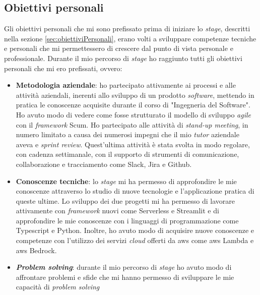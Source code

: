 \subsection{Obiettivi personali}
Gli obiettivi personali che mi sono prefissato prima di iniziare lo \textit{stage}, descritti nella sezione \ref{sec:obiettiviPersonali}, erano volti a sviluppare competenze tecniche e personali che mi permettessero di crescere dal punto di vista personale e professionale.
Durante il mio percorso di \textit{stage} ho raggiunto tutti gli obiettivi personali che mi ero prefissati, ovvero:
\begin{itemize}
    \item \textbf{Metodologia aziendale}: ho partecipato attivamente ai processi e alle attività aziendali, inerenti allo sviluppo di un prodotto \textit{software}, mettendo in pratica le conoscenze acquisite durante il corso di "Ingegneria del Software". Ho avuto modo di vedere come fosse strutturato il modello di sviluppo \textit{agile} con il \textit{framework} Scum. Ho partecipato alle attività di \textit{stand-up meeting}, in numero limitato a causa  dei numerosi impegni che il mio \textit{tutor} aziendale aveva e \textit{sprint review}. Quest'ultima attività è stata svolta in modo regolare, con cadenza settimanale, con il supporto di strumenti di comunicazione, collaborazione e tracciamento come Slack, Jira e Github. 
    \item \textbf{Conoscenze tecniche}: lo \textit{stage} mi ha permesso di approfondire le mie conoscenze attraverso lo studio di nuove tecnologie e l'applicazione pratica di queste ultime. Lo sviluppo dei due progetti mi ha permesso di lavorare attivamente con \textit{framework} nuovi come Serverless e Streamlit e di approfondire le mie conoscenze con i linguaggi di programmazione come Typescript e Python. Inoltre, ho avuto modo di acquisire nuove conoscenze e competenze con l'utilizzo dei servizi \textit{cloud} offerti da \gls{aws} come \gls{aws} Lambda e \gls{aws} Bedrock.
    \item \textbf{\textit{Problem solving}}: durante il mio percorso di \textit{stage} ho avuto modo di affrontare problemi e sfide che mi hanno permesso di sviluppare le mie capacità di \textit{problem solving}
\end{itemize}

